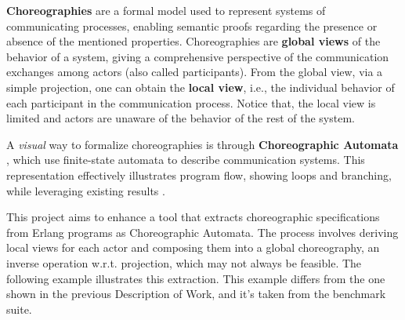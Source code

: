 \textbf{Choreographies} are a formal model used to 
represent systems of communicating processes, enabling semantic proofs 
regarding the presence or absence of the mentioned properties. Choreographies 
are \textbf{global views} of the behavior of a system, giving a comprehensive 
perspective of the communication exchanges among actors (also called 
participants). From the global view, via a simple projection, one can obtain 
the \textbf{local view}, i.e., the individual behavior of each participant in 
the communication process. Notice that, the local view is limited and actors 
are unaware of the behavior of the rest of the system.

A \textit{visual} way to formalize choreographies is through 
\textbf{Choreographic Automata} \cite{barbanerachoreography}, which use 
finite-state automata to describe communication systems. This representation 
effectively illustrates program flow, showing loops and branching, while 
leveraging existing results \cite{orlando2021corinne}.

This project aims to enhance a tool that extracts choreographic specifications 
from Erlang programs as Choreographic Automata. The process involves deriving 
local views for each actor and composing them into a global choreography, an 
inverse operation w.r.t. projection, which may not always be feasible. The 
following example illustrates this extraction. This example differs from the
one shown in the previous Description of Work, and it's taken from the benchmark
suite.

